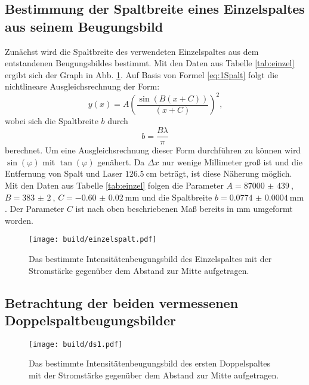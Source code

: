 \subsection{Bestimmung der Spaltbreite eines Einzelspaltes aus seinem Beugungsbild}
Zunächst wird die Spaltbreite des verwendeten Einzelspaltes aus dem entstandenen Beugungsbildes bestimmt.
Mit den Daten aus Tabelle \ref{tab:einzel} ergibt sich der Graph in Abb. \ref{fig:einzer}.
 Auf Basis von Formel \eqref{eq:1Spalt} folgt die nichtlineare Ausgleichsrechnung der Form:
\begin{equation}
  y(x) = A \left( \frac{\sin(B (x+C))}{(x+C)}\right)^2 \text{,}
\end{equation}
wobei sich die Spaltbreite $b$ durch
\begin{equation}
  b = \frac{B \lambda}{\pi}
  \end{equation}
  berechnet. Um eine Ausgleichsrechnung dieser Form durchführen zu können wird $\sin(\varphi)$ mit $\tan(\varphi)$ genähert.
  Da $\Delta x$ nur wenige Millimeter groß ist und die Entfernung
   von Spalt und Laser $\SI{126.5}{\centi\meter}$ beträgt, ist diese Näherung möglich. Mit den Daten aus Tabelle \ref{tab:einzel} folgen die Parameter
  $A = \SI{87000(439)}{}$, $B = \SI{383(2)}{}$, $C = \SI{-0.60(2)}{\milli\meter}$ und
   die Spaltbreite $b = \SI{0.0774(4)}{\milli\meter}$. Der Parameter $C$ ist nach oben beschriebenen Maß bereits in $\si{\milli\meter}$ umgeformt worden.
\begin{figure}
 \centering
 \caption{Das bestimmte Intensitätenbeugungsbild des Einzelspaltes mit der Stromstärke gegenüber dem Abstand zur Mitte aufgetragen.}
 \texttt{[image: build/einzelspalt.pdf]}
 \label{fig:einzer}
\end{figure}

\subsection{Betrachtung der beiden vermessenen Doppelspaltbeugungsbilder}
\begin{figure}
 \centering
 \caption{Das bestimmte Intensitätenbeugungsbild des ersten Doppelspaltes mit der Stromstärke gegenüber dem Abstand zur Mitte aufgetragen.}
 \texttt{[image: build/ds1.pdf]}
 \label{fig:dseins}
\end{figure}

